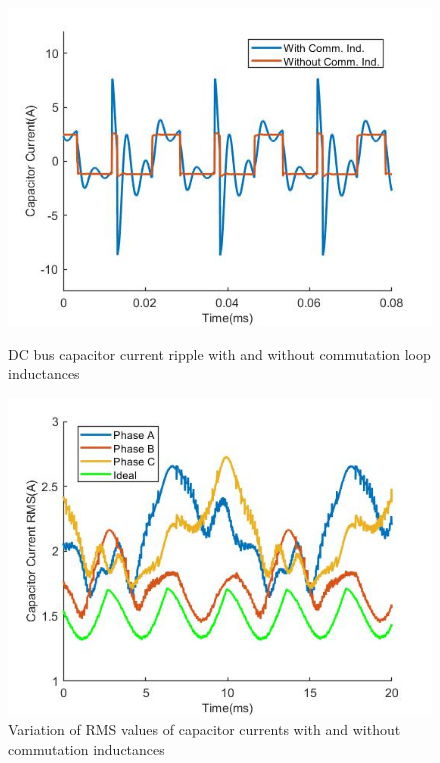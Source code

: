 \begin{figure}[tb]
  \includegraphics[width=\linewidth]{figures/single_module_curr_ripple.jpg}
  \caption{DC bus capacitor current ripple with and without commutation loop inductances}\label{fig:single_module_curr_ripple}
\endminipage\hfill
{}
  \includegraphics[width=\linewidth]{figures/CapacitorCurrentRMS.jpg}
  \caption{Variation of RMS values of capacitor currents with and without commutation inductances}\label{fig:CapacitorCurrentRMS}
\endminipage
\end{figure}


